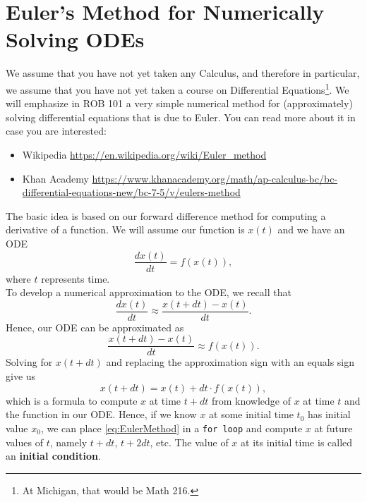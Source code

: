 \section{Euler's Method for Numerically Solving ODEs}

We assume that you have not yet taken any Calculus, and therefore in particular, we assume that you have not yet taken a course on Differential Equations\footnote{At Michigan, that would be Math 216.}. We will emphasize in ROB 101 a very simple numerical method for (approximately) solving differential equations that is due to Euler. You can read more about it in case you are interested:
\begin{itemize}
    \item Wikipedia \url{https://en.wikipedia.org/wiki/Euler_method}
    \item Khan Academy \url{https://www.khanacademy.org/math/ap-calculus-bc/bc-differential-equations-new/bc-7-5/v/eulers-method}
\end{itemize}
The basic idea is based on our forward difference method for computing a derivative of a function. We will assume our function is $x(t)$ and we have an ODE 
\begin{equation}
\boxed{
    \frac{dx(t)}{dt} = f(x(t)),
    }
\end{equation}
where $t$ represents time.\\


To develop a numerical approximation to the ODE, we recall that 
\begin{equation}
    \frac{dx(t)}{dt} \approx \frac{x(t+dt) - x(t)}{dt}.
\end{equation}
Hence, our ODE can be approximated as
\begin{equation}
    \frac{x(t+dt) - x(t)}{dt} \approx f(x(t)).
\end{equation}
Solving for $x(t+dt)$ and replacing the approximation sign with an equals sign give us
\begin{equation}
\label{eq:EulerMethod}
\boxed{
    x(t+dt) = x(t) + dt \cdot f(x(t)), 
    }
\end{equation}
which is a formula to compute $x$ at time $t+dt$ from knowledge of $x$ at time $t$ and the function in our ODE. Hence, if we know $x$ at some initial time $t_0$ has initial value $x_0$, we can place \eqref{eq:EulerMethod} in a \texttt{for\,loop} and compute $x$ at future values of $t$, namely $t + dt$, $t + 2 dt$, etc. The value of $x$ at its initial time is called an \textbf{initial condition}. 


